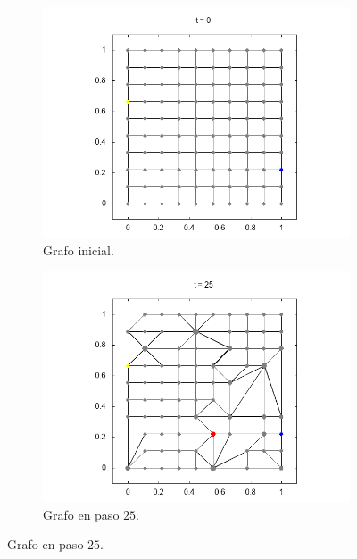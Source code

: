 \documentclass{article}
\begin{document}
  \begin{figure}[h] %
    \centering
    \begin{subfigure}[b]{0.45\textwidth}
      \includegraphics[width=\textwidth]{t000}
      \caption{Grafo inicial.}
      \label{fig:a}
    \end{subfigure}
    \begin{subfigure}[b]{0.45\textwidth}
      \includegraphics[width=\textwidth]{t025}
      \caption{Grafo en paso $25$.}
      \label{fig:b}
    \end{subfigure}


\end{figure}
\end{document}
